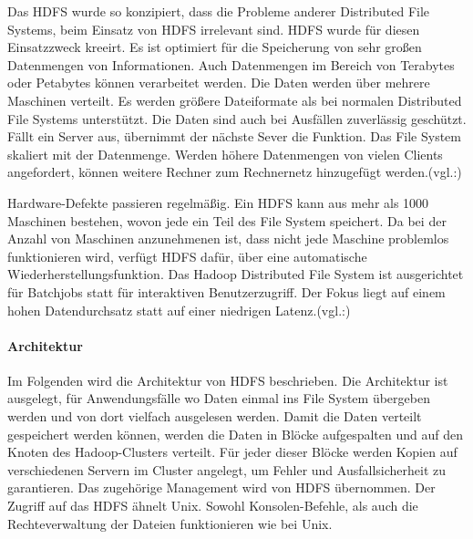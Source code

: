 Das HDFS wurde so konzipiert, dass die Probleme anderer Distributed File Systems, beim Einsatz von HDFS irrelevant sind. HDFS wurde für diesen Einsatzzweck kreeirt. Es ist optimiert für die Speicherung von sehr großen Datenmengen von Informationen. Auch Datenmengen im Bereich von Terabytes oder Petabytes können verarbeitet werden. Die Daten werden über mehrere Maschinen verteilt. Es werden größere Dateiformate als bei normalen Distributed File Systems unterstützt. Die Daten sind auch bei Ausfällen zuverlässig geschützt. Fällt ein Server aus, übernimmt der nächste Sever die Funktion. Das File System skaliert mit der Datenmenge. Werden höhere Datenmengen von vielen Clients angefordert, können weitere Rechner zum Rechnernetz hinzugefügt werden.(vgl.:\cite{yahoo})

Hardware-Defekte passieren regelmäßig. Ein HDFS kann aus mehr als 1000 Maschinen bestehen, wovon jede ein Teil des File System speichert. Da bei der Anzahl von Maschinen anzunehmenen ist, dass nicht jede Maschine problemlos funktionieren wird, verfügt HDFS dafür, über eine automatische Wiederherstellungsfunktion. Das Hadoop Distributed File System ist ausgerichtet für Batchjobs statt für interaktiven Benutzerzugriff. Der Fokus liegt auf einem hohen Datendurchsatz statt auf einer niedrigen Latenz.(vgl.:\cite{archguid})
 
\paragraph{Architektur}$\;$ \\
Im Folgenden wird die Architektur von HDFS beschrieben. Die Architektur ist ausgelegt, für Anwendungsfälle wo Daten einmal ins File System übergeben werden und von dort vielfach ausgelesen werden. Damit die Daten verteilt gespeichert werden können, werden die Daten in Blöcke aufgespalten und auf den Knoten des Hadoop-Clusters verteilt. Für jeder dieser Blöcke werden Kopien auf verschiedenen Servern im Cluster angelegt, um Fehler und Ausfallsicherheit zu garantieren. Das zugehörige Management wird von HDFS übernommen. Der Zugriff auf das HDFS ähnelt Unix. Sowohl Konsolen-Befehle, als auch die Rechteverwaltung der Dateien funktionieren wie bei Unix. 

